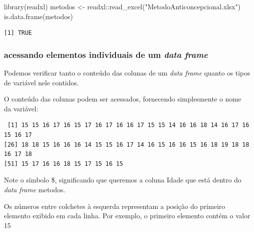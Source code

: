 \documentclass[
]{article}
\newenvironment{Shaded}{\begin{snugshade}}{\end{snugshade}}
\newcommand{\DecValTok}[1]{\textcolor[rgb]{0.00,0.00,0.81}{#1}}
\newcommand{\FunctionTok}[1]{\textcolor[rgb]{0.00,0.00,0.00}{#1}}
\newcommand{\NormalTok}[1]{#1}
\newcommand{\OtherTok}[1]{\textcolor[rgb]{0.56,0.35,0.01}{#1}}
\newcommand{\SpecialCharTok}[1]{\textcolor[rgb]{0.00,0.00,0.00}{#1}}
\newcommand{\StringTok}[1]{\textcolor[rgb]{0.31,0.60,0.02}{#1}}
\begin{document}
\begin{Shaded}
\begin{Highlighting}[]
\FunctionTok{library}\NormalTok{(readxl)}
\NormalTok{metodos }\OtherTok{\textless{}{-}}\NormalTok{ readxl}\SpecialCharTok{::}\FunctionTok{read\_excel}\NormalTok{(}\StringTok{"MetodoAnticoncepcional.xlsx"}\NormalTok{)}
\FunctionTok{is.data.frame}\NormalTok{(metodos)}
\end{Highlighting}
\end{Shaded}

\begin{verbatim}
[1] TRUE
\end{verbatim}

\hypertarget{acessando-elementos-individuais-de-um-data-frame}{%
\subsubsection{\texorpdfstring{acessando elementos individuais de um
\emph{data
frame}}{acessando elementos individuais de um data frame}}\label{acessando-elementos-individuais-de-um-data-frame}}

Podemos verificar tanto o conteúdo das colunas de um \emph{data frame}
quanto os tipos de variável nele contidos.

O conteúdo das colunas podem ser acessados, fornecendo simplesmente o
nome da variável:

\begin{Shaded}
\end{Shaded}

\begin{verbatim}
 [1] 15 15 16 17 16 15 17 16 17 16 16 17 15 15 14 16 16 18 14 16 17 16 15 16 17
[26] 18 18 15 16 16 16 14 15 15 16 17 14 16 15 16 16 15 16 18 19 18 18 16 17 18
[51] 15 17 16 16 18 15 17 15 16 15
\end{verbatim}

Note o símbolo \$, significando que queremos a coluna Idade que está
dentro do \emph{data frame} metodos.

Os números entre colchetes à esquerda representam a posição do primeiro
elemento exibido em cada linha. Por exemplo, o primeiro elemento contém
o valor 15

\begin{Shaded}
\end{Shaded}
\end{document}
